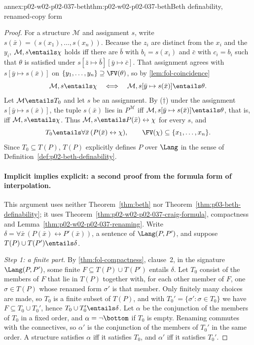 \begin{annexitem}{annex:p02-w02-p02-037-beth}{thm:p02-w02-p02-037-beth}{Beth definability, renamed-copy form}
\begin{proof}
For a structure \(\mathcal M\) and assignment \(s\), write
\(s(\bar x)=(s(x_1),\ldots,s(x_n))\).  Because the \(z_i\) are distinct from
the \(x_i\) and the \(y_i\), \(\mathcal M,s\entails\chi\) holds iff there
are \(\bar b\) with \(b_i=s(x_i)\) and \(\bar c\) with \(c_i=b_i\) such that
\(\theta\) is satisfied under
\(s[\bar z\mapsto\bar b][\bar y\mapsto\bar c]\).  That assignment agrees
with \(s[\bar y\mapsto s(\bar x)]\) on \(\{y_1,\ldots,y_n\}\supseteq
\FV(\theta)\), so by \cref{lem:fol-coincidence}
\[
 \mathcal M,s\entails\chi
 \quad\Longleftrightarrow\quad
 \mathcal M,s[\bar y\mapsto s(\bar x)]\entails\theta .
\]
Let \(\mathcal M\entails T_0\) and let \(s\) be an assignment.  By
(\(\dagger\)) under the assignment \(s[\bar y\mapsto s(\bar x)]\), the tuple
\(s(\bar x)\) lies in \(P^{\mathcal M}\) iff
\(\mathcal M,s[\bar y\mapsto s(\bar x)]\entails\theta\), that is, iff
\(\mathcal M,s\entails\chi\).  Thus
\(\mathcal M,s\entails P(\bar x)\leftrightarrow\chi\) for every \(s\), and
\[
 T_0\entails\forall\bar x\,(P(\bar x)\leftrightarrow\chi),
 \qquad
 \FV(\chi)\subseteq\{x_1,\ldots,x_n\}.
\]
Since \(T_0\subseteq T(P)\), \(T(P)\) explicitly defines \(P\) over
\(\Lang\) in the sense of Definition~\ref{def:p02-beth-definability}.

\paragraph{Implicit implies explicit: a second proof from the formula form of interpolation.}
This argument uses neither Theorem~\ref{thm:beth} nor
Theorem~\ref{thm:p03-beth-definability}; it uses
Theorem~\ref{thm:p02-w02-p02-037-craig-formula}, compactness and
Lemma~\ref{thm:p02-w02-p02-037-renaming}.  Write
\(\delta=\forall\bar x\,(P(\bar x)\leftrightarrow P'(\bar x))\), a sentence
of \(\Lang(P,P')\), and suppose \(T(P)\cup T(P')\entails\delta\).

\emph{Step 1: a finite part.}  By \cref{thm:fol-compactness}, clause~2, in
the signature \(\Lang(P,P')\), some finite
\(F\subseteq T(P)\cup T(P')\) entails \(\delta\).  Let \(T_0\) consist of
the members of \(F\) that lie in \(T(P)\) together with, for each other
member of \(F\), one \(\sigma\in T(P)\) whose renamed form \(\sigma'\) is
that member.  Only finitely many choices are made, so \(T_0\) is a finite
subset of \(T(P)\), and with \(T_0'=\{\sigma':\sigma\in T_0\}\) we have
\(F\subseteq T_0\cup T_0'\), hence \(T_0\cup T_0'\entails\delta\).  Let
\(\alpha\) be the conjunction of the members of \(T_0\) in a fixed order,
and \(\alpha=\neg\bottom\) if \(T_0\) is empty.  Renaming commutes with the
connectives, so \(\alpha'\) is the conjunction of the members of \(T_0'\)
in the same order.  A structure satisfies \(\alpha\) iff it satisfies
\(T_0\), and \(\alpha'\) iff it satisfies \(T_0'\).


\end{proof}
\end{annexitem}
